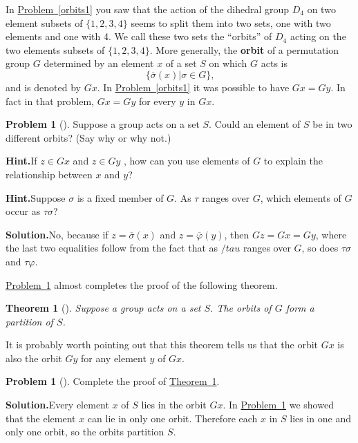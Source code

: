 \documentclass[10pt,]{book}
\newcommand{\terminology}[1]{\textbf{#1}}
\theoremstyle{plain}
\newtheorem{theorem}{Theorem}[section]
\theoremstyle{definition}
\newtheorem{activity}[project]{Problem}
\theoremstyle{definition}
\numberwithin{equation}{chapter}
\begin{document}
In \hyperref[orbits1]{Problem~\ref{orbits1}} you saw that the action of the dihedral group \(D_4\) on two element subsets of \(\{1,2,3,4\}\) seems to split them into two sets, one with two elements and one with 4. We call these two sets the ``orbits'' of \(D_4\) acting on the two elements subsets of \(\{1,2,3,4\}\). More generally, the \terminology{orbit} of a permutation group \(G\) determined by an element \(x\) of a set \(S\) on which \(G\) acts is%
\begin{equation*}
\{\overline{\sigma}(x)| \sigma \in G\}\text{,}
\end{equation*}
and is denoted by \(Gx\). In \hyperref[orbits1]{Problem~\ref{orbits1}} it was possible to have \(Gx = Gy\). In fact in that problem, \(Gx = Gy\) for every \(y\) in \(Gx\).%
\begin{activity}[]\label{disjoint-orbits}
Suppose a group acts on a set \(S\). Could an element of \(S\) be in two different orbits? (Say why or why not.)%
\par\medskip\noindent%
\textbf{Hint.}\quad If \(z \in Gx\) and \(z \in Gy\) , how can you use elements of \(G\) to explain the relationship between \(x\) and \(y\)?%
\par\medskip\noindent%
\textbf{Hint.}\quad Suppose \(\sigma\) is a fixed member of \(G\). As \(\tau\) ranges over \(G\), which elements of \(G\) occur as \(\tau\sigma\)?%
\par\medskip\noindent%
\textbf{Solution.}\quad No, because if \(z = \overline{\sigma}(x)\) and \(z = \overline{\varphi}(y)\), then \(Gz = Gx = Gy\), where the last two equalities follow from the fact that as \(/tau\) ranges over \(G\), so does \(\tau\sigma\) and \(\tau\varphi\).%
\end{activity}
\hyperref[disjoint-orbits]{Problem~\ref{disjoint-orbits}} almost completes the proof of the following theorem.%
\begin{theorem}[{}]\label{thm-orbits-partition}
Suppose a group acts on a set \(S\). The orbits of \(G\) form a partition of \(S\).%
\end{theorem}
It is probably worth pointing out that this theorem tells us that the orbit \(Gx\) is also the orbit \(Gy\) for any element \(y\) of \(Gx\).%
\begin{activity}[]\label{activity-290}
Complete the proof of \hyperref[thm-orbits-partition]{Theorem~\ref{thm-orbits-partition}}.%
\par\medskip\noindent%
\textbf{Solution.}\quad Every element \(x\) of \(S\) lies in the orbit \(Gx\). In \hyperref[disjoint-orbits]{Problem~\ref{disjoint-orbits}} we showed that the element \(x\) can lie in only one orbit. Therefore each \(x\) in \(S\) lies in one and only one orbit, so the orbits partition \(S\).%
\end{activity}
\end{document}
